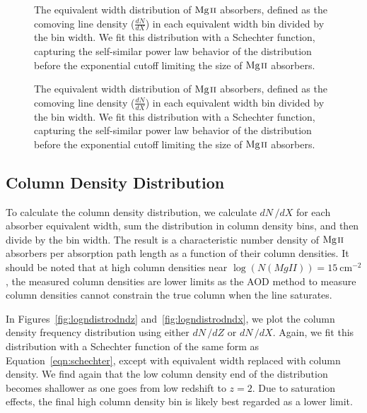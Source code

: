 \documentclass[iop,apj,numberedappendix,appendixfloats,twocolappendix]{emulateapj}
\begin{document}
\begin{figure*}[bth]
\caption{The equivalent width distribution of ${\hbox{{\rm Mg}\kern 0.1em{\sc ii}}}$ absorbers, defined as the comoving line density ($\frac{dN}{dX}$) in each equivalent width bin divided by the bin width. We fit this distribution with a Schechter function, capturing the self-similar power law behavior of the distribution before the exponential cutoff limiting the size of ${\hbox{{\rm Mg}\kern 0.1em{\sc ii}}}$ absorbers.}
\label{fig:ewdistrodndz}
\end{figure*}

\begin{figure*}[bth]
\caption{The equivalent width distribution of ${\hbox{{\rm Mg}\kern 0.1em{\sc ii}}}$ absorbers, defined as the comoving line density ($\frac{dN}{dX}$) in each equivalent width bin divided by the bin width. We fit this distribution with a Schechter function, capturing the self-similar power law behavior of the distribution before the exponential cutoff limiting the size of ${\hbox{{\rm Mg}\kern 0.1em{\sc ii}}}$ absorbers.}
\label{fig:ewdistrodndx}
\end{figure*}

\subsection{Column Density Distribution}
\label{sec:logndistro}

To calculate the column density distribution, we calculate $dN\,/dX$ for each absorber equivalent width, sum the distribution in column density bins, and then divide by the bin width. The result is a characteristic number density of ${\hbox{{\rm Mg}\kern 0.1em{\sc ii}}}$ absorbers per absorption path length as a function of their column densities. It should be noted that at high column densities near $\log (N(MgII)) = 15~\mathrm{cm^{-2}}$, the measured column densities are lower limits as the AOD method to measure column densities cannot constrain the true column when the line saturates.

In Figures~\ref{fig:logndistrodndz} and~\ref{fig:logndistrodndx}, we plot the column density frequency distribution using either $dN\,/dZ$ or $dN\,/dX$. Again, we fit this distribution with a Schechter function of the same form as Equation~\ref{eqn:schechter}, except with equivalent width replaced with column density. We find again that the low column density end of the distribution becomes shallower as one goes from low redshift to $z = 2$. Due to saturation effects, the final high column density bin is likely best regarded as a lower limit. 
\end{document}
